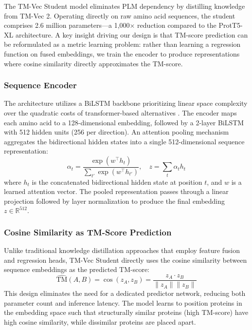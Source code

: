 \documentclass[runningheads]{llncs}
\begin{document}
The TM-Vec Student model eliminates PLM dependency by distilling knowledge from TM-Vec 2. Operating directly on raw amino acid sequences, the student comprises 2.6 million parameters—a 1,000× reduction compared to the ProtT5-XL architecture. A key insight driving our design is that TM-score prediction can be reformulated as a metric learning problem: rather than learning a regression function on fused embeddings, we train the encoder to produce representations where cosine similarity directly approximates the TM-score.

\subsubsection{Sequence Encoder}
The architecture utilizes a BiLSTM backbone \cite{hochreiter1997long,graves2005framewise} prioritizing linear space complexity over the quadratic costs of transformer-based alternatives \cite{abduljabbar2021development}. The encoder maps each amino acid to a 128-dimensional embedding, followed by a 2-layer BiLSTM with 512 hidden units (256 per direction). An attention pooling mechanism aggregates the bidirectional hidden states into a single 512-dimensional sequence representation:
\begin{equation}
\alpha_t = \frac{\exp(w^\top h_t)}{\sum_{t'} \exp(w^\top h_{t'})}, \quad z = \sum_t \alpha_t h_t
\end{equation}
where $h_t$ is the concatenated bidirectional hidden state at position $t$, and $w$ is a learned attention vector. The pooled representation passes through a linear projection followed by layer normalization to produce the final embedding $z \in \mathbb{R}^{512}$.

\subsubsection{Cosine Similarity as TM-Score Prediction}
Unlike traditional knowledge distillation approaches that employ feature fusion and regression heads, TM-Vec Student directly uses the cosine similarity between sequence embeddings as the predicted TM-score:
\begin{equation}
\widehat{\text{TM}}(A, B) = \cos(z_A, z_B) = \frac{z_A \cdot z_B}{\|z_A\| \|z_B\|}
\end{equation}
This design eliminates the need for a dedicated predictor network, reducing both parameter count and inference latency. The model learns to position proteins in the embedding space such that structurally similar proteins (high TM-score) have high cosine similarity, while dissimilar proteins are placed apart.
\end{document}
